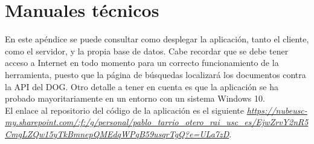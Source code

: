 \chapter{Manuales técnicos}

En este apéndice se puede consultar como desplegar la aplicación, tanto el cliente, como el servidor, y la propia base de datos. Cabe recordar que se debe tener acceso a Internet en todo momento para un correcto funcionamiento de la herramienta, puesto que la página de búsquedas localizará los documentos contra la API del DOG. Otro detalle a tener en cuenta es que la aplicación se ha probado mayoritariamente en un entorno con un sistema Windows 10.
\\

El enlace al repositorio del código de la aplicación es el siguiente {\it \url{https://nubeusc-my.sharepoint.com/:f:/g/personal/pablo_tarrio_otero_rai_usc_es/EjwZrvY2nR5CmgLZQw15yTkBmnepQMEdqWPqB59usqrTgQ?e=ULa7zD}}.


